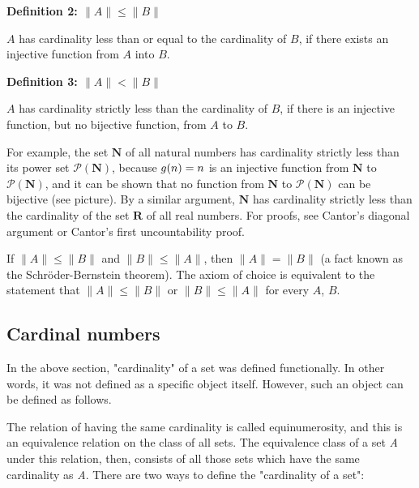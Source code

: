 \textbf{Definition 2: $\|A\| \leq \|B\|$}



$A$ has cardinality less than or equal to the cardinality of $B$, if there exists an
injective function from $A$ into $B$.



\textbf{Definition 3: $\|A\| < \|B\|$}



$A$ has cardinality strictly less than the cardinality of $B$, if there is an injective
function, but no bijective function, from $A$ to $B$.



For example, the set $\mathbf{N}$ of all natural numbers has cardinality strictly less
than its power set $\mathcal{P}(\mathbf{N})$, because $g(n) = \\{n\\}$ is an injective
function from $\mathbf{N}$ to $\mathcal{P}(\mathbf{N})$, and it can be shown that no
function from $\mathbf{N}$ to $\mathcal{P}(\mathbf{N})$ can be bijective (see picture). By
a similar argument, $\mathbf{N}$ has cardinality strictly less than the cardinality of the
set $\mathbf{R}$ of all real numbers. For proofs, see Cantor's diagonal argument or
Cantor's first uncountability proof.



If $\|A\| \leq \|B\|$ and $\|B\| \leq \|A\|$, then $\|A\| = \|B\|$ (a fact known as the
Schröder-Bernstein theorem). The axiom of choice is equivalent to the statement that
$\|A\| \leq \|B\|$ or $\|B\| \leq \|A\|$ for every $A$, $B$.




\subsection{Cardinal numbers}
\label{sss:card-b337}




In the above section, "cardinality" of a set was defined functionally. In other words, it
was not defined as a specific object itself. However, such an object can be defined as
follows.



The relation of having the same cardinality is called equinumerosity, and this is an
equivalence relation on the class of all sets. The equivalence class of a set \textit{A}
under this relation, then, consists of all those sets which have the same cardinality as
\textit{A}. There are two ways to define the "cardinality of a set":



